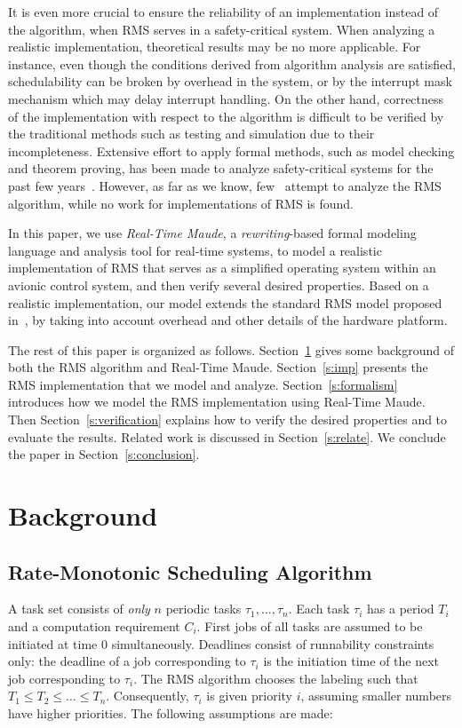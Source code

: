 \documentclass[journal]{IEEEtranTIE}
\begin{document}
It is even more crucial to ensure the reliability of an implementation
instead of the algorithm, when RMS serves in a safety-critical
system. When analyzing a realistic implementation, theoretical results
may be no more applicable. For instance, even though the conditions
derived from algorithm analysis are satisfied, schedulability can be
broken by overhead in the system, or by the interrupt mask mechanism
which may delay interrupt handling. On the other hand, correctness of
the implementation with respect to the algorithm is difficult to be
verified by the traditional methods such as testing and simulation due
to their incompleteness. Extensive effort to apply formal methods,
such as model checking and theorem proving, has been made to analyze
safety-critical systems for the past few
years~\cite{DBLP:journals/tie/JiangZLDSGS15,DBLP:journals/iandc/MeseguerR13,DBLP:journals/cacm/Leroy09,DBLP:conf/sosp/KleinEHACDEEKNSTW09}. However,
as far as we know, few~\cite{TianD2011,DBLP:conf/iceccs/CuiDT14}
attempt to analyze the RMS algorithm, while no work for
implementations of RMS is found.

In this paper, we use \emph{Real-Time Maude}, a \emph{rewriting}-based
formal modeling language and analysis tool for real-time systems, to
model a realistic implementation of RMS that serves as a simplified
operating system within an avionic control system, and then verify
several desired properties. Based on a realistic implementation, our
model extends the standard RMS model proposed
in~\cite{DBLP:journals/jacm/LiuL73}, by taking into account overhead
and other details of the hardware platform.

The rest of this paper is organized as
follows. Section~\ref{s:background} gives some background of both the
RMS algorithm and Real-Time Maude.  Section~\ref{s:imp} presents the
RMS implementation that we model and analyze.
Section~\ref{s:formalism} introduces how we model the RMS
implementation using Real-Time Maude. Then
Section~\ref{s:verification} explains how to verify the desired
properties and to evaluate the results. Related work is discussed in
Section~\ref{s:relate}. We conclude the paper in
Section~\ref{s:conclusion}.


\section{Background}
\label{s:background}

\subsection{Rate-Monotonic Scheduling Algorithm}
\label{ss:rms}
A task set consists of \emph{only} $n$ periodic tasks
$\tau_1,\ldots,\tau_n$. Each task $\tau_i$ has a period $T_i$ and a
computation requirement $C_i$. First jobs of all tasks are assumed to
be initiated at time $0$ simultaneously.  Deadlines consist of
runnability constraints only: the deadline of a job corresponding to
$\tau_i$ is the initiation time of the next job corresponding to
$\tau_i$.  The RMS algorithm chooses the labeling such that $T_1\le
T_2\le \ldots \le T_n$. Consequently, $\tau_i$ is given priority $i$,
assuming smaller numbers have higher priorities. The following
assumptions are made:
\end{document}
